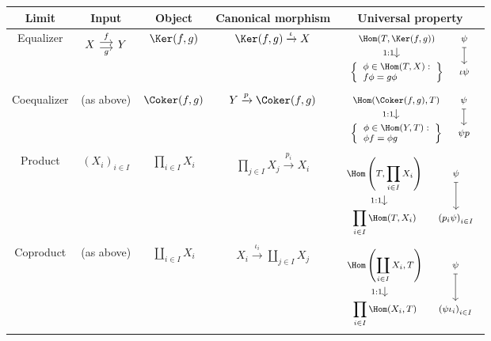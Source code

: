 \begin{center}\small\setlength{\tabcolsep}{2.5pt}\begin{tabular}{|c|c|c|c|c|} \hline
	Limit & Input & Object & Canonical morphism & Universal property \\ \hline
	Equalizer & $\begin{tikzcd}[column sep=small] X \arrow[shift left, r, "f"] \arrow[shift right, r, "g"'] & Y\end{tikzcd}$ & $\Ker(f,g)$ & $\Ker(f,g) \xrightarrow{\iota} X$ & $\begin{tikzcd}[row sep=small, column sep=tiny, every cell/.append style={font = \footnotesize}]
		\Hom(T, \Ker(f,g)) \arrow[d, "1:1"'] & \psi \arrow[mapsto, d] \\
		\left\{\begin{array}{l} \phi \in \Hom(T, X): \\ f\phi = g\phi \end{array}\right\} & \iota\psi
	\end{tikzcd}$ \\
	Coequalizer & (as above) & $\Coker(f,g)$ & $Y \xrightarrow{p} \Coker(f,g)$ & $\begin{tikzcd}[row sep=small, column sep=tiny, every cell/.append style={font = \footnotesize}]
		\Hom(\Coker(f,g), T) \arrow[d, "1:1"'] & \psi \arrow[mapsto, d] \\
		\left\{\begin{array}{l} \phi \in \Hom(Y, T): \\ \phi f = \phi g \end{array}\right\} & \psi p
	\end{tikzcd}$ \\
	Product & $(X_i)_{i \in I}$ & $\displaystyle\prod_{i \in I} X_i$ & $\displaystyle\prod_{j \in I} X_j \xrightarrow{p_i} X_i$ & $\begin{tikzcd}[row sep=small, column sep=tiny, every cell/.append style={font = \footnotesize}]
		\Hom\left(T, \displaystyle\prod_{i \in I} X_i \right) \arrow[d, "1:1"'] & \psi \arrow[mapsto, d] \\
		\displaystyle\prod_{i \in I} \Hom(T, X_i) & \left( p_i \psi \right)_{i \in I}
	\end{tikzcd}$ \\
	Coproduct & (as above) & $\displaystyle\coprod_{i \in I} X_i$ & $X_i \xrightarrow{\iota_i} \displaystyle\coprod_{j \in I} X_j$ & $\begin{tikzcd}[row sep=small, column sep=tiny, every cell/.append style={font = \footnotesize}]
		\Hom\left(\displaystyle\coprod_{i \in I} X_i, T \right) \arrow[d, "1:1"'] & \psi \arrow[mapsto, d] \\
		\displaystyle\prod_{i \in I} \Hom(X_i, T) & \left( \psi \iota_i \right)_{i \in I}
	\end{tikzcd}$ \\ \hline
\end{tabular}\end{center}

